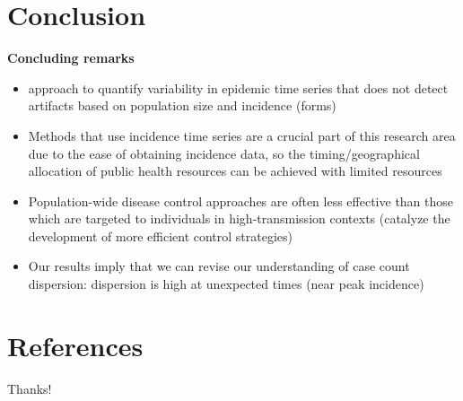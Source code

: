 \documentclass{beamer}
\begin{document}
\section{Conclusion}
\begin{frame}{\textbf{Concluding remarks}}
	\begin{itemize}[<+-| alert@+>]
		\item approach to quantify variability in epidemic time series that does not detect artifacts based on population size and incidence (forms)
		\item Methods that use incidence time series are a crucial part of this research area due to the ease of obtaining incidence data, so the timing/geographical allocation of public health resources can be achieved with limited resources
		\item Population-wide disease control approaches are often less effective than those which are targeted to individuals in high-transmission contexts \cite{lloyd-smith_superspreading_2005} (catalyze the development of more efficient control strategies)
		\item Our results imply that we can revise our understanding of case count dispersion: dispersion is high at unexpected times (near peak incidence)
	\end{itemize}
\end{frame}

\section{References}

\begin{frame}
	\begin{center}
		{\Huge Thanks!}
	\end{center}
\end{frame}
\end{document}
